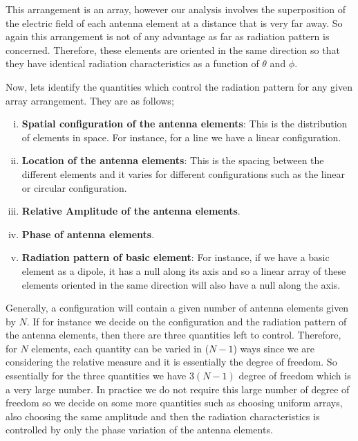 This arrangement is an array, however our analysis involves the superposition of the electric field of each antenna element at a distance that is very far away. So again this arrangement is not of any advantage as far as radiation pattern is concerned. Therefore, these elements are oriented in the same direction so that they have identical radiation characteristics as a function of $\theta$ and $\phi$.

Now, lets identify the quantities which control the radiation pattern for any given array arrangement. They are as follows;
\begin{enumerate}[(i)]
\item \textbf{Spatial configuration of the antenna elements}: This is the distribution of elements in space. For instance, for a line we have a linear configuration. 
\item \textbf{Location of the antenna elements}: This is the spacing between the different elements and it varies for different configurations such as the linear or circular configuration.
\item \textbf{Relative Amplitude of the antenna elements}.
\item\textbf{Phase of antenna elements}.
\item \textbf{Radiation pattern of basic element}: For instance, if we have a basic element as a dipole, it has a null along its axis and so a linear array of these elements oriented in the same direction will also have a null along the axis.
\end{enumerate}
Generally, a configuration will contain a given number of antenna elements given by $N$. If for instance we decide on the configuration and the radiation pattern of the antenna elements,  then there are three quantities left to control. Therefore, for $N$ elements, each quantity can be varied in ($N-1$) ways since we are considering the relative measure and it is essentially the degree of freedom. So essentially for the three quantities we have $3(N-1)$ degree of freedom which is a very large number. In practice we do not require this large number of degree of freedom so we decide on some more quantities such as choosing uniform arrays, also choosing the same amplitude and then the radiation characteristics is controlled by only the phase variation of the antenna elements.

